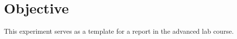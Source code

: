 \section{Objective}
\label{sec:objective}

This experiment serves as a template for a report in the advanced lab course.
